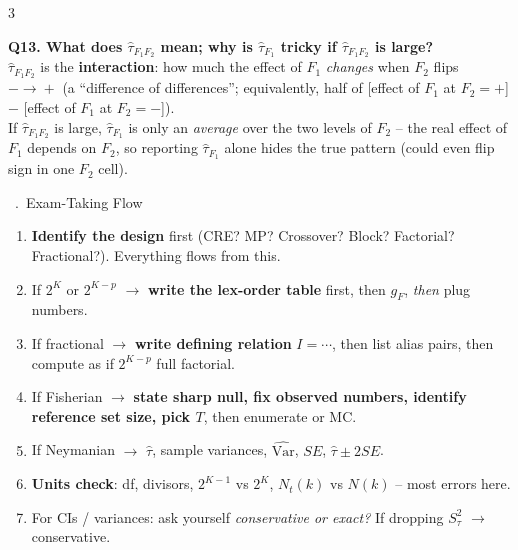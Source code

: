 \documentclass[10pt,landscape]{article}
\newcounter{secN}
\newcommand{\Sec}[1]{%
  \stepcounter{secN}%
  \vspace{3pt}\par\noindent
  \colorbox{hdr}{\color{white}\footnotesize\bfseries\parbox{0.95\columnwidth}{\strut\ \arabic{secN}.\ #1}}\par\vspace{1pt}}
\newcommand{\key}[1]{\textbf{\color{acc}#1}}
\begin{document}
\begin{multicols*}{3}
\begin{qbox}
\textbf{Q13. What does $\hat\tau_{F_1F_2}$ mean; why is $\hat\tau_{F_1}$ tricky if $\hat\tau_{F_1F_2}$ is large?}\\
$\hat\tau_{F_1F_2}$ is the \textbf{interaction}: how much the effect of $F_1$ \emph{changes} when $F_2$ flips $-\!\to\!+$ (a ``difference of differences''; equivalently, half of [effect of $F_1$ at $F_2{=}+$] $-$ [effect of $F_1$ at $F_2{=}-$]).\\
If $\hat\tau_{F_1F_2}$ is large, $\hat\tau_{F_1}$ is only an \emph{average} over the two levels of $F_2$ -- the real effect of $F_1$ depends on $F_2$, so reporting $\hat\tau_{F_1}$ alone hides the true pattern (could even flip sign in one $F_2$ cell).
\end{qbox}

\Sec{Exam-Taking Flow}

\begin{enumerate}[leftmargin=*,noitemsep,nosep]
\item \key{Identify the design} first (CRE? MP? Crossover? Block? Factorial? Fractional?). Everything flows from this.
\item If $2^K$ or $2^{K-p}$ $\to$ \key{write the lex-order table} first, then $g_F$, \emph{then} plug numbers.
\item If fractional $\to$ \key{write defining relation} $I=\cdots$, then list alias pairs, then compute as if $2^{K-p}$ full factorial.
\item If Fisherian $\to$ \key{state sharp null, fix observed numbers, identify reference set size, pick $T$}, then enumerate or MC.
\item If Neymanian $\to$ $\hat\tau$, sample variances, $\widehat{\mathrm{Var}}$, $SE$, $\hat\tau\pm 2SE$.
\item \key{Units check}: df, divisors, $2^{K-1}$ vs $2^K$, $N_t(k)$ vs $N(k)$ -- most errors here.
\item For CIs / variances: ask yourself \emph{conservative or exact?} If dropping $S_\tau^2$ $\to$ conservative.
\end{enumerate}


\end{multicols*}
\end{document}
